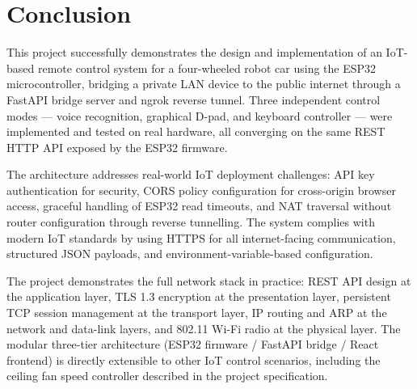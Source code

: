\documentclass[12pt]{report}
\begin{document}
\chapter{Conclusion}

This project successfully demonstrates the design and implementation of an
IoT-based remote control system for a four-wheeled robot car using the ESP32
microcontroller, bridging a private LAN device to the public internet through a
FastAPI bridge server and ngrok reverse tunnel. Three independent control
modes --- voice recognition, graphical D-pad, and keyboard controller --- were
implemented and tested on real hardware, all converging on the same REST HTTP API
exposed by the ESP32 firmware.

The architecture addresses real-world IoT deployment challenges: API key
authentication for security, CORS policy configuration for cross-origin browser
access, graceful handling of ESP32 read timeouts, and NAT traversal without
router configuration through reverse tunnelling. The system complies with
modern IoT standards by using HTTPS for all internet-facing communication,
structured JSON payloads, and environment-variable-based configuration.

The project demonstrates the full network stack in practice: REST API design at
the application layer, TLS 1.3 encryption at the presentation layer, persistent
TCP session management at the transport layer, IP routing and ARP at the network
and data-link layers, and 802.11 Wi-Fi radio at the physical layer. The modular
three-tier architecture (ESP32 firmware / FastAPI bridge / React frontend) is
directly extensible to other IoT control scenarios, including the ceiling fan
speed controller described in the project specification.
\end{document}
